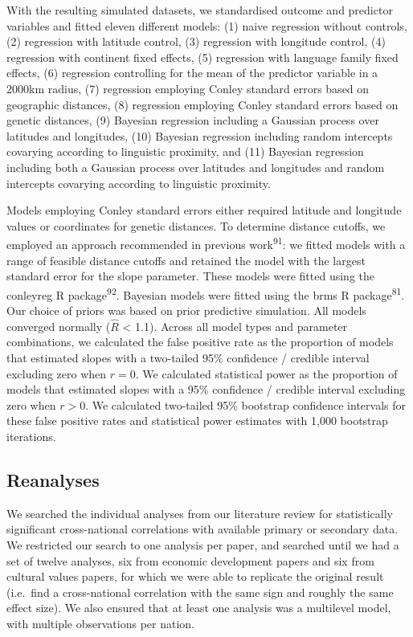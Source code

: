\documentclass[
  man,floatsintext]{apa6}
\begin{document}
With the resulting simulated datasets, we standardised outcome and predictor variables and fitted eleven different models: (1) naive regression without controls, (2) regression with latitude control, (3) regression with longitude control, (4) regression with continent fixed effects, (5) regression with language family fixed effects, (6) regression controlling for the mean of the predictor variable in a 2000km radius, (7) regression employing Conley standard errors based on geographic distances, (8) regression employing Conley standard errors based on genetic distances, (9) Bayesian regression including a Gaussian process over latitudes and longitudes, (10) Bayesian regression including random intercepts covarying according to linguistic proximity, and (11) Bayesian regression including both a Gaussian process over latitudes and longitudes and random intercepts covarying according to linguistic proximity.

Models employing Conley standard errors either required latitude and longitude values or coordinates for genetic distances. To determine distance cutoffs, we employed an approach recommended in previous work\textsuperscript{91}: we fitted models with a range of feasible distance cutoffs and retained the model with the largest standard error for the slope parameter. These models were fitted using the conleyreg R package\textsuperscript{92}. Bayesian models were fitted using the brms R package\textsuperscript{81}. Our choice of priors was based on prior predictive simulation. All models converged normally (\(\hat{R}\) \textless{} 1.1). Across all model types and parameter combinations, we calculated the false positive rate as the proportion of models that estimated slopes with a two-tailed 95\% confidence / credible interval excluding zero when \(r = 0\). We calculated statistical power as the proportion of models that estimated slopes with a 95\% confidence / credible interval excluding zero when \(r > 0\). We calculated two-tailed 95\% bootstrap confidence intervals for these false positive rates and statistical power estimates with 1,000 bootstrap iterations.

\hypertarget{reanalyses}{%
\subsection{Reanalyses}\label{reanalyses}}

We searched the individual analyses from our literature review for statistically significant cross-national correlations with available primary or secondary data. We restricted our search to one analysis per paper, and searched until we had a set of twelve analyses, six from economic development papers and six from cultural values papers, for which we were able to replicate the original result (i.e.~find a cross-national correlation with the same sign and roughly the same effect size). We also ensured that at least one analysis was a multilevel model, with multiple observations per nation.
\end{document}
